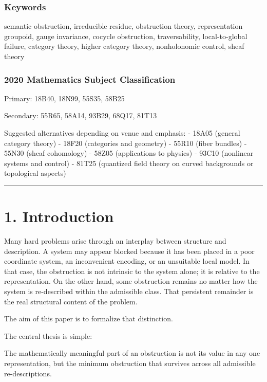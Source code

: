 \documentclass[
]{article}
\begin{document}
\subsubsection{Keywords}\label{keywords}

semantic obstruction, irreducible residue, obstruction theory,
representation groupoid, gauge invariance, cocycle obstruction,
traversability, local-to-global failure, category theory, higher
category theory, nonholonomic control, sheaf theory

\subsubsection{2020 Mathematics Subject
Classification}\label{mathematics-subject-classification}

Primary: 18B40, 18N99, 55S35, 58B25

Secondary: 55R65, 58A14, 93B29, 68Q17, 81T13

Suggested alternatives depending on venue and emphasis: - 18A05 (general
category theory) - 18F20 (categories and geometry) - 55R10 (fiber
bundles) - 55N30 (sheaf cohomology) - 58Z05 (applications to physics) -
93C10 (nonlinear systems and control) - 81T25 (quantized field theory on
curved backgrounds or topological aspects)

\begin{center}\rule{0.5\linewidth}{0.5pt}\end{center}

\section{1. Introduction}\label{introduction}

Many hard problems arise through an interplay between structure and
description. A system may appear blocked because it has been placed in a
poor coordinate system, an inconvenient encoding, or an unsuitable local
model. In that case, the obstruction is not intrinsic to the system
alone; it is relative to the representation. On the other hand, some
obstruction remains no matter how the system is re-described within the
admissible class. That persistent remainder is the real structural
content of the problem.

The aim of this paper is to formalize that distinction.

The central thesis is simple:

The mathematically meaningful part of an obstruction is not its value in
any one representation, but the minimum obstruction that survives across
all admissible re-descriptions.
\end{document}
